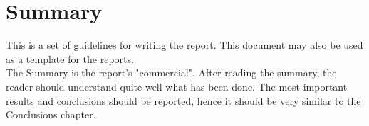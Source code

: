 \chapter*{Summary}

This is a set of guidelines for writing the report. This document may also be used as a template for the reports. \\
The Summary is the report's "commercial". After reading the summary, the reader should understand quite well what has been done. The most important results and conclusions should be reported, hence it should be very similar to the Conclusions chapter. 

\tableofcontents %
\pagestyle{plain} %

\cleardoublepage
{}